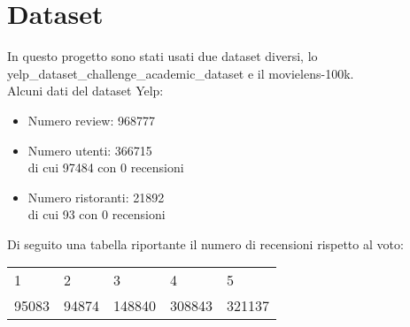 \documentclass[12pt]{article}
\begin{document}
\section*{Dataset}
In questo progetto sono stati usati due dataset diversi, lo yelp\_dataset\_challenge\_academic\_dataset e il movielens-100k.\\

Alcuni dati del dataset Yelp:\\
\begin{itemize}
\item Numero review: 968777
\item Numero utenti: 366715\\
di cui 97484 con 0 recensioni
\item Numero ristoranti: 21892\\
di cui 93 con 0 recensioni
\end{itemize}

Di seguito una tabella riportante il numero di recensioni rispetto al voto:
\begin{table}[H]
\centering
\begin{tabular}{lllll}
1 & 2 & 3 & 4 & 5 \\
95083 & 94874 & 148840 & 308843 & 321137\\
\end{tabular}
\end{table}
\end{document}
